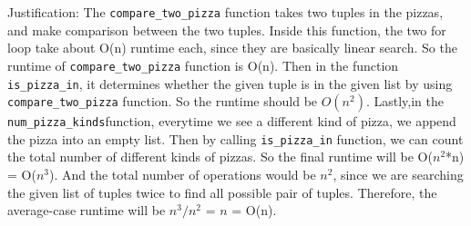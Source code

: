 \documentclass{assignment-263}
\begin{document}
\begin{enumerate}
 Justification:\vskip5pt
 The \verb|compare_two_pizza| function takes two tuples in the pizzas, and make comparison between the two tuples. Inside this function, the two for loop take about O(n) runtime each, since they are basically linear search. So the runtime of  \verb|compare_two_pizza| function is O(n). Then in the function \verb|is_pizza_in|,  it determines whether the given tuple is in the given list by using \verb|compare_two_pizza| function. So the runtime should be $O(n^2)$. Lastly,in the \verb|num_pizza_kinds|function, everytime we see a different kind of pizza, we append the pizza into an empty list. Then by calling \verb|is_pizza_in| function, we can count the total number of different kinds of pizzas. So the final runtime will be O($n^2$*n) = O($n^3$). And the total number of operations would be $n^2$, since we are searching the given list of tuples twice to find all possible pair of tuples. Therefore, the average-case runtime will be $n^3 / n^2$ = $n$ = O(n).

 \end{enumerate}
\end{document}
